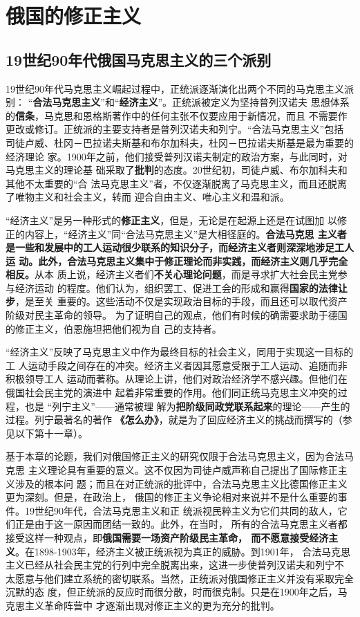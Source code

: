 \chapter{俄国的修正主义}

\section{19世纪90年代俄国马克思主义的三个派别}

19世纪90年代马克思主义崛起过程中，正统派逐渐演化出两个不同的马克思主义派别：
“\textbf{合法马克思主义}”和“\textbf{经济主义}”。正统派被定义为坚持普列汉诺夫
思想体系的\textbf{信条}，马克思和恩格斯著作中的任何主张不仅要应用于新情况，而且
不需要作更改或修订。正统派的主要支持者是普列汉诺夫和列宁。“合法马克思主义”包括
司徒卢威、杜冈－巴拉诺夫斯基和布尔加科夫，杜冈－巴拉诺夫斯基是最为重要的经济理论
家。1900年之前，他们接受普列汉诺夫制定的政治方案，与此同时，对马克思主义的理论基
础采取了\textbf{批判}的态度。20世纪初，司徒卢威、布尔加科夫和其他不太重要的“合
法马克思主义”者，不仅逐渐脱离了马克思主义，而且还脱离了唯物主义和社会主义，转而
迎合自由主义、唯心主义和温和派。

“经济主义”是另一种形式的\textbf{修正主义}，但是，无论是在起源上还是在试图加
以修正的内容上，“经济主义”同“合法马克思主义”是大相径庭的。\textbf{合法马克思
主义者是一些和发展中的工人运动很少联系的知识分子，而经济主义者则深深地涉足工人运
动。此外，合法马克思主义集中于修正理论而非实践，而经济主义则几乎完全相反。}从本
质上说，经济主义者们\textbf{不关心理论问题}，而是寻求扩大社会民主党参与经济运动
的程度。他们认为，组织罢工、促进工会的形成和赢得\textbf{国家的法律让步}，是至关
重要的。这些活动不仅是实现政治目标的手段，而且还可以取代资产阶级对民主革命的领导。
为了证明自己的观点，他们有时候的确需要求助于德国的修正主义，伯恩施坦把他们视为自
己的支持者。

“经济主义”反映了马克思主义中作为最终目标的社会主义，同用于实现这一目标的工
人运动手段之间存在的冲突。经济主义者因其愿意受限于工人运动、追随而非积极领导工人
运动而著称。从理论上讲，他们对政治经济学不感兴趣。但他们在俄国社会民主党的演进中
起着非常重要的作用。他们同正统马克思主义冲突的过程，也是 “列宁主义”——通常被理
解为\textbf{把阶级同政党联系起来}的理论——产生的过程。列宁最著名的著作
\textbf{《怎么办》}，就是为了回应经济主义的挑战而撰写的（参见以下第十一章）。

基于本章的论题，我们对俄国修正主义的研究仅限于合法马克思主义，因为合法马克思
主义理论具有重要的意义。这不仅因为司徒卢威声称自己提出了国际修正主义涉及的根本问
题；而且在对正统派的批评中，合法马克思主义比德国修正主义更为深刻。但是，在政治上，
俄国的修正主义争论相对来说并不是什么重要的事件。19世纪90年代，合法马克思主义和正
统派视民粹主义为它们共同的敌人，它们正是由于这一原因而团结一致的。此外，在当时，
所有的合法马克思主义者都接受这样一种观点，即\textbf{俄国需要一场资产阶级民主革命，
而不愿意接受经济主义}。在1898-1903年，经济主义被正统派视为真正的威胁。到1901年，
合法马克思主义已经从社会民主党的行列中完全脱离出来，这进一步使普列汉诺夫和列宁不
太愿意与他们建立系统的密切联系。当然，正统派对俄国修正主义并没有采取完全沉默的态
度，但正统派的反应时而很分散，时而很克制。只是在1900年之后，马克思主义革命阵营中
才逐渐出现对修正主义的更为充分的批判。

